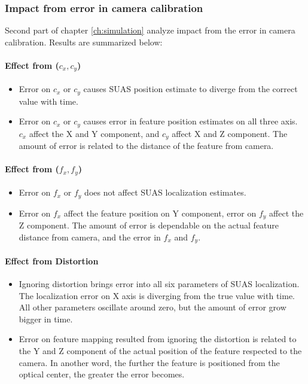 \subsubsection{Impact from error in camera calibration}
Second part of chapter \ref{ch:simulation} analyze impact from the
error in camera calibration. Results are summarized below:

\paragraph{Effect from ($c_x, c_y$)}
\begin{itemize}
  \item Error on $c_x$ or $c_y$ causes SUAS position estimate to
  diverge from the correct value with time.
  \item Error on $c_x$ or $c_y$ causes error in feature position
  estimates on all three axis. $c_x$ affect the X and Y component, and
  $c_y$ affect X and Z component. The amount of error is related to
  the distance of the feature from camera.
\end{itemize}

\paragraph{Effect from ($f_x, f_y$)}
\begin{itemize}
  \item Error on $f_x$ or $f_y$ does not affect SUAS localization
  estimates.
  \item Error on $f_x$ affect the feature position on Y component,
  error on $f_y$ affect the Z component. The amount of error is
  dependable on the actual feature distance from camera, and the error
  in $f_x$ and $f_y$. 
\end{itemize}

\paragraph{Effect from Distortion}
\begin{itemize}
  \item Ignoring distortion brings error into all six parameters of
  SUAS localization. The localization error on X axis is diverging
  from the true value with time. All other parameters oscillate around
  zero, but the amount of error grow bigger in time. 
  \item Error on feature mapping resulted from ignoring the distortion
  is related to the Y and Z component of the actual position of the
  feature respected to the camera. In another word, the further the
  feature is positioned from the optical center, the greater the error
  becomes.
\end{itemize}

